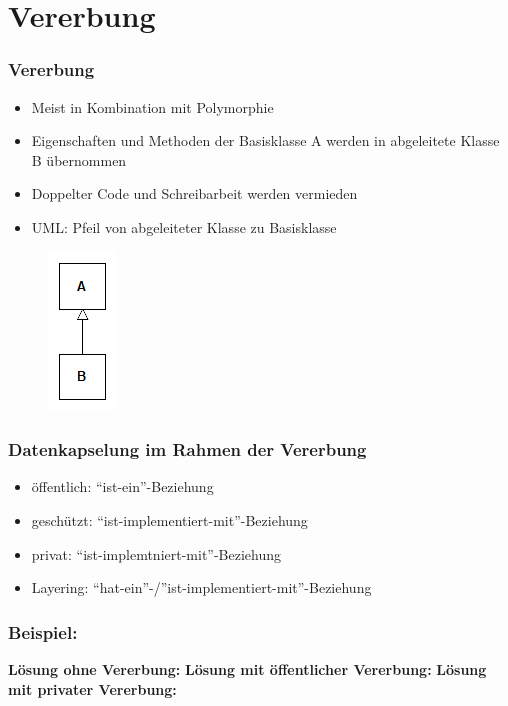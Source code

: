\section{Vererbung}

\begin{frame}
	\frametitle{Vererbung}
	\begin{itemize}
		\item Meist in Kombination mit Polymorphie
		\item Eigenschaften und Methoden der Basisklasse A werden in abgeleitete Klasse B übernommen
		\item Doppelter Code und Schreibarbeit werden vermieden
		\item UML: Pfeil von abgeleiteter Klasse zu Basisklasse
	\end{itemize}
	\begin{figure}[h]
		\includegraphics[scale=0.75]{vererbung/uml.png}
	\end{figure}
\end{frame}

\begin{frame}
	\frametitle{Datenkapselung im Rahmen der Vererbung}
	\begin{figure}[h]
		
	\end{figure}
	\begin{itemize}
		\item öffentlich: ``ist-ein''-Beziehung
		\item geschützt: ``ist-implementiert-mit''-Beziehung
		\item privat: ``ist-implemtniert-mit''-Beziehung
		\item Layering: ``hat-ein''-/''ist-implementiert-mit''-Beziehung
	\end{itemize}
\end{frame}

\begin{frame}
	\frametitle{Beispiel:}
	{\tiny\UseRawInputEncoding{}}
	\pause
	{\bfseries Lösung ohne Vererbung:}
	{\tiny\UseRawInputEncoding{}}
	\pause
	{\bfseries Lösung mit öffentlicher Vererbung:}
	{\tiny\UseRawInputEncoding{}}
	\pause
	{\tiny\UseRawInputEncoding{}}
	\pause
	{\bfseries Lösung mit privater Vererbung:}
	{\tiny\UseRawInputEncoding{}}
\end{frame}



